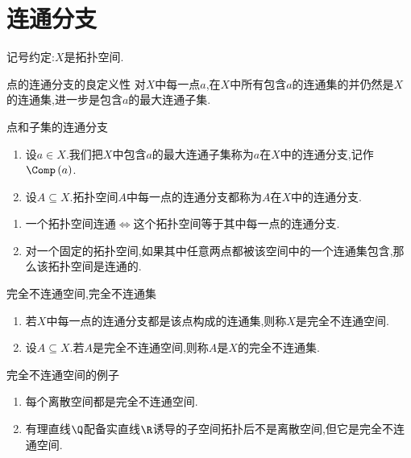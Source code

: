 \section{连通分支}

记号约定:$X$是拓扑空间.

\begin{lemma}{点的连通分支的良定义性}{}
	对$X$中每一点$a$,在$X$中所有包含$a$的连通集的并仍然是$X$的连通集,进一步是包含$a$的最大连通子集.
\end{lemma}

\begin{definition}{点和子集的连通分支}{}
	\begin{enumerate}
		\item 设$a\in X$.我们把$X$中包含$a$的最大连通子集称为$a$在$X$中的连通分支,记作$\Comp\left(a\right)$.
		\item 设$A\subseteq X$.拓扑空间$A$中每一点的连通分支都称为$A$在$X$中的连通分支.
	\end{enumerate}
\end{definition}

\begin{remark}{}{}
	\begin{enumerate}
		\item 一个拓扑空间连通$\iff$这个拓扑空间等于其中每一点的连通分支.
		\item 对一个固定的拓扑空间,如果其中任意两点都被该空间中的一个连通集包含,那么该拓扑空间是连通的.
	\end{enumerate}
\end{remark}

\begin{definition}{完全不连通空间,完全不连通集}{}
	\begin{enumerate}
		\item 若$X$中每一点的连通分支都是该点构成的连通集,则称$X$是完全不连通空间.
		\item 设$A\subseteq X$.若$A$是完全不连通空间,则称$A$是$X$的完全不连通集.
	\end{enumerate}
\end{definition}

\begin{example}{完全不连通空间的例子}{}
	\begin{enumerate}
		\item 每个离散空间都是完全不连通空间.
		\item 有理直线$\Q$配备实直线$\R$诱导的子空间拓扑后不是离散空间,但它是完全不连通空间.
	\end{enumerate}
\end{example}

